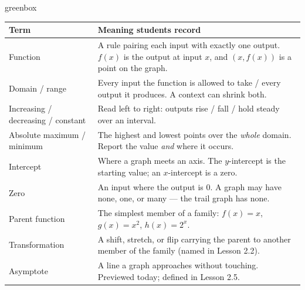 \documentclass[10pt]{article}
\begin{document}
\begin{skillbox}{greenbox}
\renewcommand{\arraystretch}{1.35}
\begin{tabularx}{\linewidth}{@{}p{3.6cm}X@{}}
\textbf{Term} & \textbf{Meaning students record} \\
\hline
Function & A rule pairing each input with exactly one output. $f(x)$ is the output at input $x$,
    and $(x, f(x))$ is a point on the graph. \\
Domain / range & Every input the function is allowed to take / every output it produces. A
    context can shrink both. \\
Increasing / decreasing / constant & Read left to right: outputs rise / fall / hold steady over an
    interval. \\
Absolute maximum / minimum & The highest and lowest points over the \emph{whole} domain. Report
    the value \emph{and} where it occurs. \\
Intercept & Where a graph meets an axis. The $y$-intercept is the starting value; an
    $x$-intercept is a zero. \\
Zero & An input where the output is $0$. A graph may have none, one, or many --- the trail graph
    has none. \\
Parent function & The simplest member of a family: $f(x)=x$, $g(x)=x^2$, $h(x)=2^x$. \\
Transformation & A shift, stretch, or flip carrying the parent to another member of the family
    (named in Lesson 2.2). \\
Asymptote & A line a graph approaches without touching. Previewed today; defined in Lesson 2.5. \\
\end{tabularx}
\end{skillbox}
\end{document}

